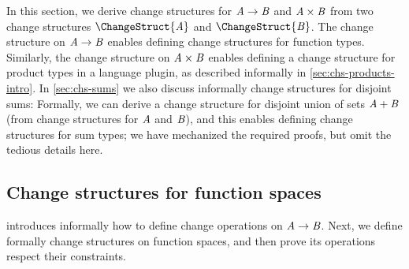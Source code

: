 In this section, we derive change structures for \ensuremath{\Conid{A}\to \Conid{B}} and \ensuremath{\Conid{A}\times\Conid{B}} from
two change structures \ensuremath{\ChangeStruct{\Conid{A}}} and \ensuremath{\ChangeStruct{\Conid{B}}}.
The change structure on \ensuremath{\Conid{A}\to \Conid{B}} enables defining change structures for function
types.
Similarly, the change structure on \ensuremath{\Conid{A}\times\Conid{B}} enables defining a change
structure for product types in a language plugin, as described informally in
\cref{sec:chs-products-intro}.
In \cref{sec:chs-sums} we also discuss informally
change structures for disjoint sums: Formally, we can derive a change structure
for disjoint union of sets \ensuremath{\Conid{A}\mathbin{+}\Conid{B}} (from change structures for \ensuremath{\Conid{A}} and \ensuremath{\Conid{B}}), and
this enables defining change structures for sum types; we have mechanized the
required proofs, but omit the tedious details here.

\subsection{Change structures for function spaces}
 introduces informally how to define change
operations on \ensuremath{\Conid{A}\to \Conid{B}}. Next, we define formally change structures on function
spaces, and then prove its operations respect their constraints.

